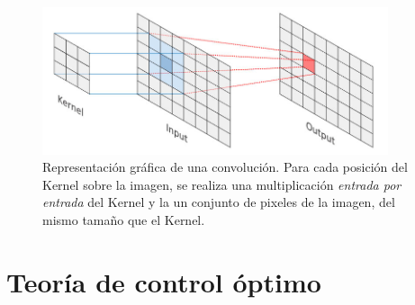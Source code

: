     \begin{figure}[H]
        \centering
        \includegraphics[width=4in]{../src/ch1convolution.jpg}
        \caption{Representación gráfica de una convolución. Para cada posición del Kernel sobre la imagen, se realiza una multiplicación \textsl{entrada por entrada} del Kernel y la un conjunto de pixeles de la imagen, del mismo tamaño que el Kernel.}
    \end{figure}


    \chapter{Teoría de control óptimo}
    

